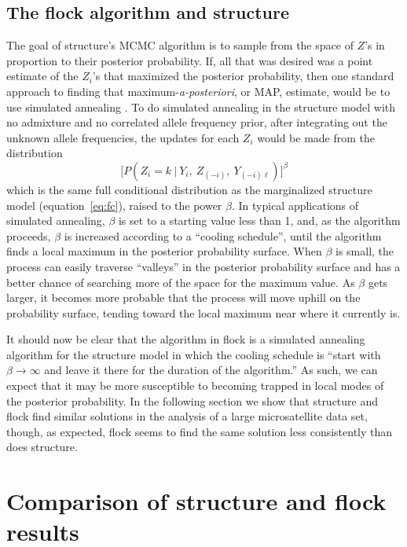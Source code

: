 \subsection*{The {\sc flock} algorithm and {\sc structure}}
The goal of {\sc structure}'s MCMC algorithm is to sample from the space of 
$Z$'s in proportion to their posterior probability.  If, all that was desired
was a point estimate of the $Z_i$'s that maximized the posterior probability,
then one standard approach to finding that maximum-{\em a-posteriori}, or MAP, 
estimate, would be to use simulated annealing \citep{Kirkpatricketal1983}.
To do simulated annealing in the {\sc structure} model with no admixture and
no correlated allele frequency prior, after integrating out the unknown
allele frequencies, the updates for each $Z_i$ would be made from the 
distribution
\[
\biggl[P(Z_i=k~|~Y_i, ~Z_{(-i)},~Y_{(-i)\ell})\biggr]^\beta
\]
which is the same full conditional distribution as the marginalized {\sc structure}
model (equation~\ref{eq:fc}), raised
to the power $\beta$.  In typical applications of simulated annealing,
$\beta$ is set to a starting value less than 1, and, as the algorithm proceeds,
$\beta$ is increased according to a ``cooling schedule''\citep{Hajek1988}, until
the algorithm finds a local maximum in the posterior probability surface.  
When $\beta$ is small, the process can easily traverse ``valleys''
in the posterior probability surface and has a better chance of searching
more of the space for the maximum value.  As $\beta$ gets larger, it becomes
more probable that the process will
move uphill on the probability surface, tending toward the local
maximum near where it currently is.    

It should now be clear that the algorithm in {\sc flock} is a simulated annealing 
algorithm for the {\sc structure} model in which the cooling schedule is
``start with $\beta\rightarrow\infty$ and leave it there for the duration of 
the algorithm.''  As such, we can expect that it may be more susceptible 
to becoming trapped in local modes of the posterior probability. 
In the following section we show that {\sc structure} and {\sc flock} find similar
solutions in the analysis of a large microsatellite data set, though, as expected,
{\sc flock} seems to find the same solution less consistently than does {\sc structure}.





\section*{Comparison of {\sc structure} and {\sc flock} results}

